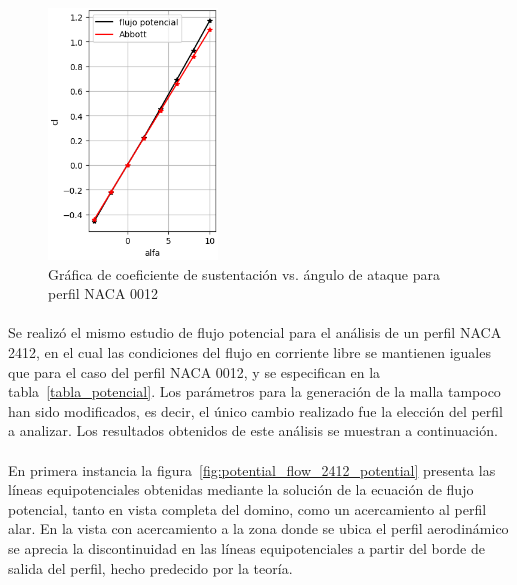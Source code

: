 \documentclass[letterpaper, openright, 12pt]{book}
\begin{document}
    \begin{figure}[htbp!]
        \centering
        \includegraphics[keepaspectratio,
            width=0.4\textwidth]{./img/potential_flow_cl}
        \caption{Gráfica de coeficiente de sustentación vs. ángulo de ataque
            para perfil NACA 0012}\label{fig:potential_flow_cl}
    \end{figure}

    \paragraph*{}
    Se realizó el mismo estudio de flujo potencial para el análisis de un
    perfil NACA 2412, en el cual las condiciones del flujo en corriente libre
    se mantienen iguales que para el caso del perfil NACA 0012, y se
    especifican en la tabla~\ref{tabla_potencial}. Los parámetros para la
    generación de la malla tampoco han sido modificados, es decir, el único
    cambio realizado fue la elección del perfil a analizar. Los resultados
    obtenidos de este análisis se muestran a continuación.

    \paragraph*{}
    En primera instancia la figura~\ref{fig:potential_flow_2412_potential}
    presenta las líneas equipotenciales obtenidas mediante la solución de la
    ecuación de flujo potencial, tanto en vista completa del domino, como un
    acercamiento al perfil alar. En la vista con acercamiento a la zona donde se
    ubica el perfil aerodinámico se aprecia la discontinuidad en las líneas
    equipotenciales a partir del borde de salida del perfil, hecho predecido
    por la teoría.
\end{document}
